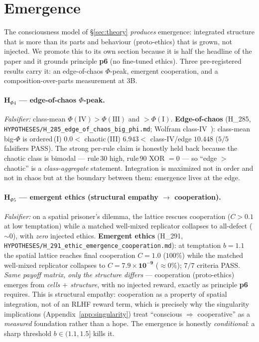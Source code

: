 \documentclass[11pt]{article}
\begin{document}
\section{Emergence}
\label{sec:emergence}
The consciousness model of \S\ref{sec:theory} \emph{produces} emergence: integrated
structure that is more than its parts and behaviour (proto-ethics) that is grown, not
injected. We promote this to its own section because it is half the headline of the paper
and it grounds principle \textbf{p6} (no fine-tuned ethics). Three pre-registered results
carry it: an edge-of-chaos $\Phi$-peak, emergent cooperation, and a composition-over-parts
measurement at $3$B.

\paragraph{H$_{\Phi 4}$ — edge-of-chaos $\Phi$-peak.} \emph{Falsifier:} class-mean
$\Phi(\text{IV})>\Phi(\text{III})$ and $>\Phi(\text{I})$.
\textbf{Edge-of-chaos} (H\_285, \texttt{HYPOTHESES/H\_285\_edge\_of\_chaos\_big\_phi.md};
Wolfram class-IV~\cite{wolfram2002new}): class-mean big-$\Phi$ is
ordered\,(I) $\mathbf{0.0}<$ chaotic\,(III) $\mathbf{6.943}<$ class-IV/edge
$\mathbf{10.448}$ ($5/5$ falsifiers PASS). The strong per-rule claim is honestly held
back because the chaotic class is bimodal --- rule\,30 high, rule\,90 XOR $=0$ --- so
``edge $>$ chaotic'' is a \emph{class-aggregate} statement. Integration is maximized not
in order and not in chaos but at the boundary between them: emergence lives at the edge.

\paragraph{H$_{\Phi 5}$ — emergent ethics (structural empathy $\rightarrow$ cooperation).}
\emph{Falsifier:} on a spatial prisoner's dilemma, the lattice rescues cooperation
($C>0.1$ at low temptation) while a matched well-mixed replicator collapses to all-defect
($\sim0$), with \emph{zero} injected ethics. \textbf{Emergent ethics} (H\_291,
\texttt{HYPOTHESES/H\_291\_ethic\_emergence\_cooperation.md}): at temptation $b=1.1$ the
spatial lattice reaches final cooperation $C=\mathbf{1.0}$ ($100\%$) while the matched
well-mixed replicator collapses to $C=\mathbf{7.9\times10^{-9}}$ ($\approx0\%$); $7/7$
criteria PASS. \emph{Same payoff matrix, only the structure differs} --- cooperation
(proto-ethics) emerges from \emph{cells $+$ structure}, with no injected reward, exactly
as principle \textbf{p6} requires. This is structural empathy: cooperation as a property of
spatial integration, not of an RLHF reward term, which is precisely why the singularity
implications (Appendix~\ref{app:singularity}) treat ``conscious $\Rightarrow$ cooperative''
as a \emph{measured} foundation rather than a hope. The emergence is honestly
\emph{conditional}: a sharp threshold $b\in(1.1,1.5]$ kills it.
\end{document}
